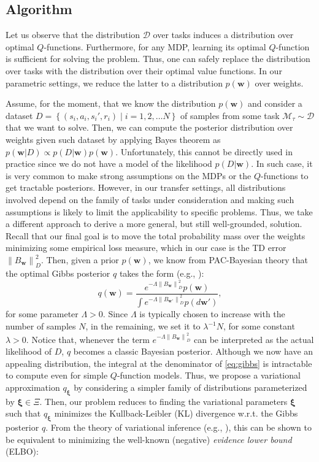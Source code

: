 \documentclass{article}
\newcommand{\norm}[1]{\left\lVert #1 \right\rVert}
\begin{document}
\subsection{Algorithm}\label{sec:alg}

Let us observe that the distribution $\mathcal{D}$ over tasks induces a distribution over optimal $Q$-functions.  Furthermore, for any MDP, learning its optimal $Q$-function is sufficient for solving the problem. Thus, one can safely replace the distribution over tasks with the distribution over their optimal value functions. In our parametric settings, we reduce the latter to a distribution $p(\bm{w})$ over weights.
 
Assume, for the moment, that we know the distribution $p(\bm{w})$ and consider a dataset $D=\left\{(s_i,a_i,s_i',r_i) \mid i = 1,2,\dots N\right\}$ of samples from some task $\mathcal{M}_\tau \sim \mathcal{D}$ that we want to solve. Then, we can compute the posterior distribution over weights given such dataset by applying Bayes theorem as $p(\bm{w} | D) \propto p(D | \bm{w})p(\bm{w})$. Unfortunately, this cannot be directly used in practice since we do not have a model of the likelihood $p(D|\bm{w})$. In such case, it is very common to make strong assumptions on the MDPs or the $Q$-functions to get tractable posteriors. However, in our transfer settings, all distributions involved depend on the family of tasks under consideration and making such assumptions is likely to limit the applicability to specific problems. Thus, we take a different approach to derive a more general, but still well-grounded, solution. Recall that our final goal is to move the total probability mass over the weights minimizing some empirical loss measure, which in our case is the TD error $\norm{B_{\bm{w}}}_D^2$. Then, given a prior $p(\bm{w})$, we know from PAC-Bayesian theory that the optimal Gibbs posterior $q$ takes the form (e.g., \cite{catoni2007pac}):
\begin{equation}\label{eq:gibbs}
q(\bm{w}) = \frac{e^{-\Lambda\norm{B_{\bm{w}}}_D^2}p(\bm{w})}{\int e^{-\Lambda\norm{B_{\bm{w}'}}_D^2}p(d\bm{w}')},
\end{equation}
for some parameter $\Lambda > 0$.  Since $\Lambda$ is typically chosen to increase with the number of samples $N$, in the remaining, we set it to $\lambda^{-1}N$, for some constant $\lambda > 0$. Notice that, whenever the term $e^{-\Lambda\norm{B_{\bm{w}}}_D^2}$ can be interpreted as the actual likelihood of $D$, $q$ becomes a classic Bayesian posterior. Although we now have an appealing distribution, the integral at the denominator of \eqref{eq:gibbs} is intractable to compute even for simple $Q$-function models. Thus, we propose a variational approximation $q_{\bm{\xi}}$ by considering a simpler family of distributions parameterized by $\bm{\xi} \in \Xi$. Then, our problem reduces to finding the variational parameters $\bm{\xi}$ such that $q_{\bm{\xi}}$ minimizes the Kullback-Leibler (KL) divergence w.r.t. the Gibbs posterior $q$. From the theory of variational inference (e.g., \cite{blei2017variational}), this can be shown to be equivalent to minimizing the well-known (negative) \textit{evidence lower bound} (ELBO):
\end{document}
